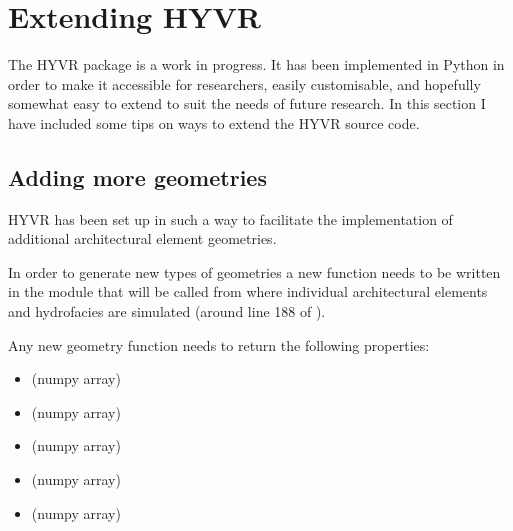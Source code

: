\documentclass[letterpaper,10pt,english]{sphinxmanual}
\begin{document}
\chapter{Extending HYVR}
\label{more::doc}\label{more:extending-hyvr}
The HYVR package is a work in progress. It has been implemented in Python in order to make it accessible for researchers, easily customisable, and hopefully somewhat easy to extend to suit the needs of future research. In this section I have included some tips on ways to extend the HYVR source code.


\section{Adding more geometries}
\label{more:adding-more-geometries}
HYVR has been set up in such a way to facilitate the implementation of additional architectural element geometries.

In order to generate new types of geometries a new function needs to be written in the  module that will be called from  where individual architectural elements and hydrofacies are simulated (around line 188 of ).

Any new geometry function needs to return the following properties:
\begin{itemize}
\item {} 
 (numpy array)

\item {} 
 (numpy array)

\item {} 
 (numpy array)

\item {} 
 (numpy array)

\item {} 
 (numpy array)

\end{itemize}
\end{document}
